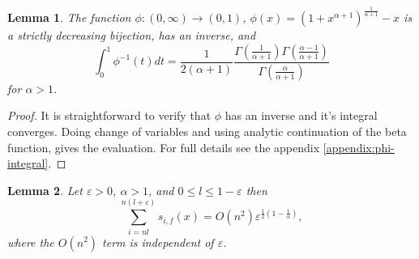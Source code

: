 \documentclass[10pt]{article}
\theoremstyle{plain}
\newtheorem{lemma}{Lemma}
\theoremstyle{definition}
\let\epsilon\varepsilon
\begin{document}
	
	
	
	
	
	
	\begin{lemma}\label{phi integral}
		The function $\phi:(0,\infty)\to(0,1)$, $\phi(x)=(1+x^{\alpha+1})^{\frac{1}{\alpha+1}}-x$ is a strictly decreasing bijection, has an inverse, and
		\begin{equation}
			\int_{0}^{1} \phi^{-1}(t)dt=\frac{1}{2(\alpha+1)}
			\frac{\Gamma(\frac{1}{\alpha+1})\Gamma(\frac{\alpha-1}{\alpha+1})}{\Gamma(\frac{\alpha}{\alpha+1})}
		\end{equation}
		for $\alpha>1$.
	\end{lemma}
	
	\begin{proof}
		It is straightforward to verify that $\phi$ has an inverse and it's integral converges. Doing change of variables and using analytic continuation of the beta function, gives the evaluation. For full details see the appendix \ref{appendix:phi-integral}.
	\end{proof}
	
	
	
	
	
	
	\begin{lemma}\label{head's neglible}
		Let $\epsilon>0$, $\alpha>1$, and $0\leq l\leq1-\epsilon$ then 
		\begin{equation}
			\sum_{i=nl}^{n(l+\epsilon)} s_{i, f}(x)=O(n^2)\epsilon^{\frac{1}{2}(1-\frac{1}{\alpha})},
		\end{equation}
		where the $O(n^2)$ term is independent of $\epsilon$.
	\end{lemma}
	
\end{document}
